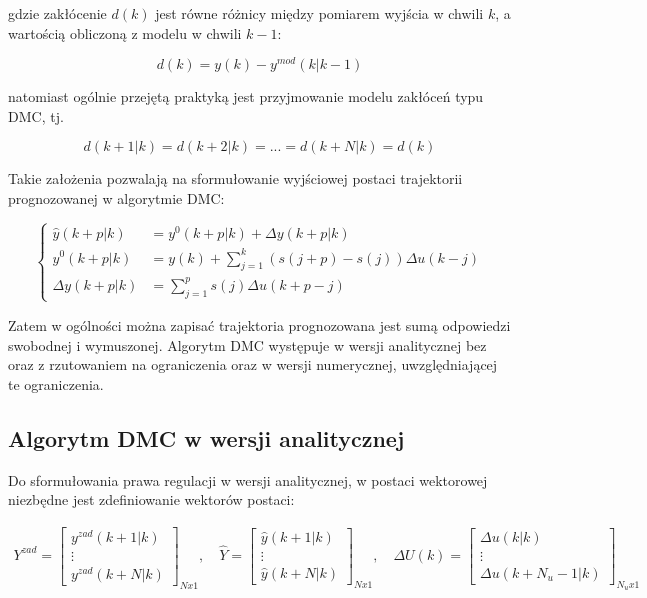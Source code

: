 \noindent gdzie zakłócenie $d(k)$ jest równe różnicy między pomiarem wyjścia w chwili $k$, a wartością obliczoną z modelu w chwili $k-1$:

\begin{equation}
d(k) = y(k) - y^{mod}(k|k-1)
\end{equation}

\noindent natomiast ogólnie przejętą praktyką jest przyjmowanie modelu zakłóceń typu DMC, tj.

\begin{equation}
d(k+1|k) = d(k+2|k) = ... = d(k+N|k) = d(k)
\end{equation}

Takie założenia pozwalają na sformułowanie wyjściowej postaci trajektorii prognozowanej w algorytmie DMC:

\begin{equation}
\left\{
\begin{aligned}
\hat{y}(k+p|k) &= y^0(k+p|k) + \Delta y(k+p|k) \\
y^0(k+p|k) &= y(k) + \sum_{j=1}^k (s(j+p) - s(j))\Delta u(k-j)  \\
\Delta y(k+p|k) &= \sum_{j=1}^p s(j) \Delta u(k+p-j)
\end{aligned}
\right.
\label{prognoza}
\end{equation}

Zatem w ogólności można zapisać trajektoria prognozowana jest sumą odpowiedzi swobodnej i wymuszonej. Algorytm DMC występuje w wersji analitycznej bez oraz z rzutowaniem na ograniczenia oraz w wersji numerycznej, uwzględniającej te ograniczenia. 

\subsection{Algorytm DMC w wersji analitycznej}
Do sformułowania prawa regulacji w wersji analitycznej, w postaci wektorowej niezbędne jest zdefiniowanie wektorów postaci:

\begin{equation}
\begin{aligned}
Y^{zad} = \begin{bmatrix}
y^{zad}(k+1|k) \\ \vdots \\ y^{zad}(k+N|k)
\end{bmatrix}_{Nx1}, \quad
\hat{Y} = \begin{bmatrix}
\hat{y}(k+1|k) \\ \vdots \\ \hat{y}(k+N|k)
\end{bmatrix}_{Nx1}, \quad
\Delta U(k) = \begin{bmatrix}
\Delta u(k|k) \\ \vdots \\ \Delta u(k+N_u-1|k)
\end{bmatrix}_{N_ux1}
\end{aligned}
\end{equation}

